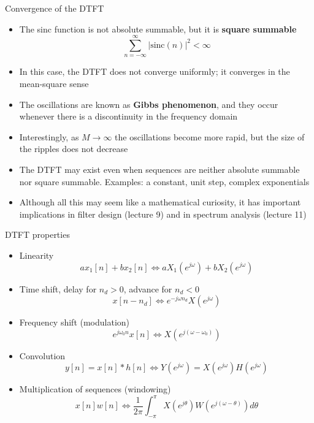 \documentclass[10pt]{beamer}
\begin{document}
%
\begin{frame}{Convergence of the DTFT}
\begin{itemize}
	\item The sinc function is not absolute summable, but it is \textbf{square summable}
	\begin{equation*}
		\sum_{n=-\infty}^{\infty} |\mathrm{sinc}(n)|^2 < \infty
	\end{equation*}
	\item In this case, the DTFT does not converge uniformly; it converges in the mean-square sense
	\item The oscillations are known as \textbf{Gibbs phenomenon}, and they occur whenever there is a discontinuity in the frequency domain
	\item Interestingly, as $M\to\infty$ the oscillations become more rapid, but the size of the ripples does not decrease
	\item The DTFT may exist even when sequences are neither absolute summable nor square summable. Examples: a constant, unit step, complex exponentials
	\item Although all this may seem like a mathematical curiosity, it has important implications in filter design (lecture 9) and in spectrum analysis (lecture 11)
\end{itemize}
	
\end{frame}

%
\begin{frame}{DTFT properties}
\begin{itemize}
\item Linearity
	\begin{equation*}
	ax_1[n]  + bx_2[n] \Longleftrightarrow aX_1(e^{j\omega})+bX_2(e^{j\omega})
	\end{equation*}
\item Time shift, delay for $n_d > 0$, advance for $n_d < 0$
	\begin{equation*}
	x[n-n_d] \Longleftrightarrow e^{-j\omega n_d}X(e^{j\omega})
	\end{equation*}
\item Frequency shift (modulation)
	\begin{equation*}
	e^{j\omega_0n}x[n] \Longleftrightarrow X(e^{j(\omega-\omega_0)})
	\end{equation*}
\item Convolution
	\begin{equation*}
	y[n] = x[n]\ast h[n] \Longleftrightarrow Y(e^{j\omega}) = X(e^{j\omega})H(e^{j\omega})
	\end{equation*}
\item Multiplication of sequences (windowing)
	\begin{equation*}
	x[n]w[n] \Longleftrightarrow \frac{1}{2\pi}\int_{-\pi}^{\pi}X(e^{j\theta})W(e^{j(\omega-\theta)}){d\theta}
	\end{equation*}
\end{itemize}
\end{frame}
\end{document}
